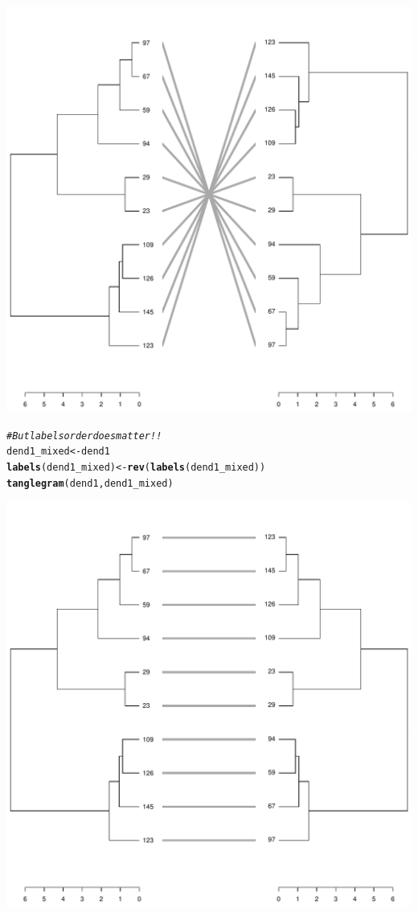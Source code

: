 \documentclass[shortnames,nojss,article]{jss}\usepackage[]{graphicx}\usepackage[]{color}
\makeatletter
\def\maxwidth{ %
  \ifdim\Gin@nat@width>\linewidth
    \linewidth
  \else
    \Gin@nat@width
  \fi
}
\newcommand{\hlcom}[1]{\textcolor[rgb]{0.678,0.584,0.686}{\textit{#1}}}%
\newcommand{\hlstd}[1]{\textcolor[rgb]{0.345,0.345,0.345}{#1}}%
\newcommand{\hlkwb}[1]{\textcolor[rgb]{0.69,0.353,0.396}{#1}}%
\newcommand{\hlkwd}[1]{\textcolor[rgb]{0.737,0.353,0.396}{\textbf{#1}}}%
\newenvironment{kframe}{%
 \def\at@end@of@kframe{}%
 \ifinner\ifhmode%
  \def\at@end@of@kframe{\end{minipage}}%
  \begin{minipage}{\columnwidth}%
 \fi\fi%
 \def\FrameCommand##1{\hskip\@totalleftmargin \hskip-\fboxsep
 \colorbox{shadecolor}{##1}\hskip-\fboxsep
     \hskip-\linewidth \hskip-\@totalleftmargin \hskip\columnwidth}%
 \MakeFramed {\advance\hsize-\width
   \@totalleftmargin\z@ \linewidth\hsize
   \@setminipage}}%
 {\par\unskip\endMakeFramed%
 \at@end@of@kframe}
\newenvironment{knitrout}{}{} %
\makeatother
\begin{document}
\begin{knitrout}
{\centering \includegraphics[width=\maxwidth]{figure/cor_bakers_gamma_example_12} 

}


\begin{kframe}\begin{alltt}
\hlcom{# But labels order does matter!!}
\hlstd{dend1_mixed} \hlkwb{<-} \hlstd{dend1}
\hlkwd{labels}\hlstd{(dend1_mixed)} \hlkwb{<-} \hlkwd{rev}\hlstd{(}\hlkwd{labels}\hlstd{(dend1_mixed))}
\hlkwd{tanglegram}\hlstd{(dend1, dend1_mixed)}
\end{alltt}
\end{kframe}

{\centering \includegraphics[width=\maxwidth]{figure/cor_bakers_gamma_example_13} 

}
\end{knitrout}
\end{document}
